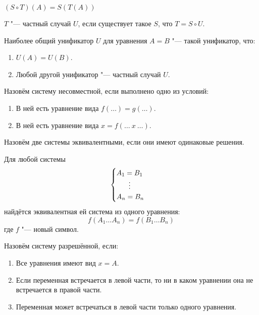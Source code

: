 \begin{definition}[композиция]
    $(S \circ T)(A) = S(T(A))$
\end{definition}

\begin{definition}
    $T$ "--- частный случай $U$, если существует такое $S$, что $T = S \circ U$.
\end{definition}

\begin{definition}
    Наиболее общий унификатор $U$ для уравнения $A=B$ "--- такой унификатор, что:
    \begin{enumerate}
        \item $U(A)=U(B)$.
        \item Любой другой унификатор "--- частный случай $U$.
    \end{enumerate}
\end{definition}

\begin{definition}
    Назовём систему несовместной, если выполнено одно из условий:
    \begin{enumerate}
        \item В ней есть уравнение вида $f(\ldots)=g(\ldots)$.
        \item В ней есть уравнение вида $x = f(\ldots~x~\ldots)$.
    \end{enumerate}
\end{definition}

\begin{definition}
    Назовём две системы эквивалентными, если они имеют одинаковые решения.
\end{definition}

\begin{statement}
    Для любой системы
    \[
        \begin{cases}
            A_1 = B_1 \\
            \phantom{A_1} \mathrel{\makebox[\widthof{=}]{\vdots}} \\
            A_n = B_n
        \end{cases}
    \]
    найдётся эквивалентная ей система из одного уравнения:
    \[
        f(A_1 \ldots A_n) = f(B_1 \ldots B_n)
    \]
    где $f$ "--- новый символ.
\end{statement}

\begin{definition}
    Назовём систему разрешённой, если:
    \begin{enumerate}
        \item Все уравнения имеют вид $x = A$.
        \item Если переменная встречается в левой части, то ни в каком уравнении она не встречается в правой части.
        \item Переменная может встречаться в левой части только одного уравнения.
    \end{enumerate}
\end{definition}

